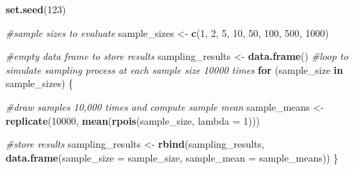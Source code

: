\documentclass[
]{book}
\newenvironment{Shaded}{\begin{snugshade}}{\end{snugshade}}
\newcommand{\AttributeTok}[1]{\textcolor[rgb]{0.13,0.29,0.53}{#1}}
\newcommand{\CommentTok}[1]{\textcolor[rgb]{0.56,0.35,0.01}{\textit{#1}}}
\newcommand{\ControlFlowTok}[1]{\textcolor[rgb]{0.13,0.29,0.53}{\textbf{#1}}}
\newcommand{\DecValTok}[1]{\textcolor[rgb]{0.00,0.00,0.81}{#1}}
\newcommand{\FunctionTok}[1]{\textcolor[rgb]{0.13,0.29,0.53}{\textbf{#1}}}
\newcommand{\NormalTok}[1]{#1}
\newcommand{\OtherTok}[1]{\textcolor[rgb]{0.56,0.35,0.01}{#1}}
\begin{document}
\begin{Shaded}
\begin{Highlighting}[]
\FunctionTok{set.seed}\NormalTok{(}\DecValTok{123}\NormalTok{)}

\CommentTok{\#sample sizes to evaluate}
\NormalTok{sample\_sizes }\OtherTok{\textless{}{-}} \FunctionTok{c}\NormalTok{(}\DecValTok{1}\NormalTok{, }\DecValTok{2}\NormalTok{, }\DecValTok{5}\NormalTok{, }\DecValTok{10}\NormalTok{, }\DecValTok{50}\NormalTok{, }\DecValTok{100}\NormalTok{, }\DecValTok{500}\NormalTok{, }\DecValTok{1000}\NormalTok{) }

\CommentTok{\#empty data frame to store results}
\NormalTok{sampling\_results }\OtherTok{\textless{}{-}} \FunctionTok{data.frame}\NormalTok{()}
\CommentTok{\#loop to simulate sampling process at each sample size 10000 times}
\ControlFlowTok{for}\NormalTok{ (sample\_size }\ControlFlowTok{in}\NormalTok{ sample\_sizes) \{}
  
  \CommentTok{\#draw samples 10,000 times and compute sample mean}
\NormalTok{  sample\_means }\OtherTok{\textless{}{-}} \FunctionTok{replicate}\NormalTok{(}\DecValTok{10000}\NormalTok{, }\FunctionTok{mean}\NormalTok{(}\FunctionTok{rpois}\NormalTok{(sample\_size, }\AttributeTok{lambda =} \DecValTok{1}\NormalTok{)))}
  
  \CommentTok{\#store results}
\NormalTok{  sampling\_results }\OtherTok{\textless{}{-}} \FunctionTok{rbind}\NormalTok{(sampling\_results, }
                            \FunctionTok{data.frame}\NormalTok{(}\AttributeTok{sample\_size =}\NormalTok{ sample\_size, }
                                       \AttributeTok{sample\_mean =}\NormalTok{ sample\_means))}
\NormalTok{\}}


\end{Highlighting}
\end{Shaded}
\end{document}
